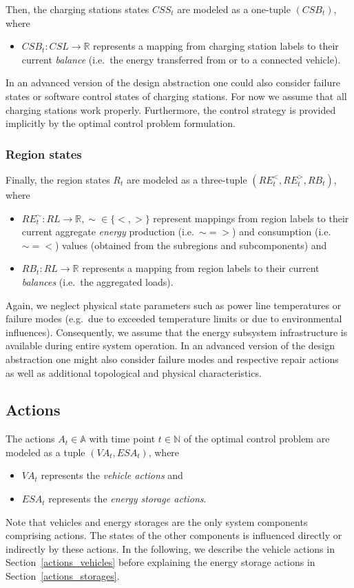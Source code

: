 Then, the charging stations states $CSS_t$ are modeled as a one-tuple $(CSB_t)$, where
\begin{itemize}
	\item $CSB_t: CSL \rightarrow \mathbb{R}$ represents a mapping from charging station labels to their current \textit{balance} (i.e.\ the energy transferred from or to a connected vehicle).
\end{itemize}
In an advanced version of the design abstraction one could also consider failure states or software control states of charging stations. For now we assume that all charging stations work properly. Furthermore, the control strategy is provided implicitly by the optimal control problem formulation.

\subsubsection{Region states}
\label{states_regions}

Finally, the region states $R_t$ are modeled as a three-tuple $(RE_t^<, RE_t^>, RB_t)$, where
\begin{itemize}
	\item $RE_t^\sim: RL \rightarrow \mathbb{R}, \sim \in \{<,>\}$ represent mappings from region labels to their current aggregate \textit{energy} production (i.e.\ $\sim = >$) and consumption (i.e.\ $\sim = <$) values (obtained from the subregions and subcomponents) and
	\item $RB_t: RL \rightarrow \mathbb{R}$ represents a mapping from region labels to their current \textit{balances} (i.e.\ the aggregated loads).
\end{itemize}
Again, we neglect physical state parameters such as power line temperatures or failure modes (e.g.\ due to exceeded temperature limits or due to environmental influences). Consequently, we assume that the energy subsystem infrastructure is available during entire system operation. In an advanced version of the design abstraction one might also consider failure modes and respective repair actions~\cite{anghel2007stochastic} as well as additional topological and physical characteristics.

\subsection{Actions}
\label{actions}

The actions $A_t \in \mathbb{A}$ with time point $t \in \mathbb{N}$ of the optimal control problem are modeled as a tuple $(VA_t, ESA_t)$, where
\begin{itemize}
	\item $VA_t$ represents the \textit{vehicle actions} and
	\item $ESA_t$ represents the \textit{energy storage actions}.
\end{itemize}
Note that vehicles and energy storages are the only system components comprising actions. The states of the other components is influenced directly or indirectly by these actions. In the following, we describe the vehicle actions in Section~\ref{actions_vehicles} before explaining the energy storage actions in Section~\ref{actions_storages}.

